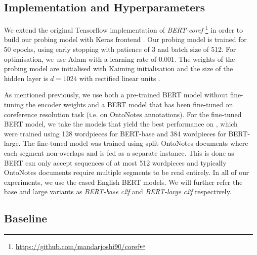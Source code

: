 \documentclass[11pt]{article}
\begin{document}
\subsection{Implementation and Hyperparameters} 

We extend the original Tensorflow implementation of \textit{BERT-coref} \footnote{\url{https://github.com/mandarjoshi90/coref}} in order to build our probing model with Keras frontend \parencite{chollet2015keras}. Our probing model is trained for 50 epochs, using early stopping with patience of 3 and batch size of 512. For optimisation, we use Adam \parencite{adam} with a learning rate of 0.001. The weights of the probing model are initialised with Kaiming initialisation \parencite{kaiming} and the size of the hidden layer is $d=1024$ with rectified linear units \parencite{relu}.

As mentioned previously, we use both a pre-trained BERT model without fine-tuning the encoder weights and a BERT model that has been fine-tuned on coreference resolution task (i.e. on OntoNotes annotations). For the fine-tuned BERT model, we take the models that yield the best performance on \textcite{joshi2019coref}, which were trained using 128 wordpieces for BERT-base and 384 wordpieces for BERT-large. The fine-tuned model was trained using split OntoNotes documents where each segment non-overlaps and is fed as a separate instance. This is done as BERT can only accept sequences of at most 512 wordpieces and typically OntoNotes documents require multiple segments to be read entirely. In all of our experiments, we use the cased English BERT models. We will further refer the base and large variants as \textit{BERT-base c2f} and \textit{BERT-large c2f} respectively.

\subsection{Baseline}
\end{document}

